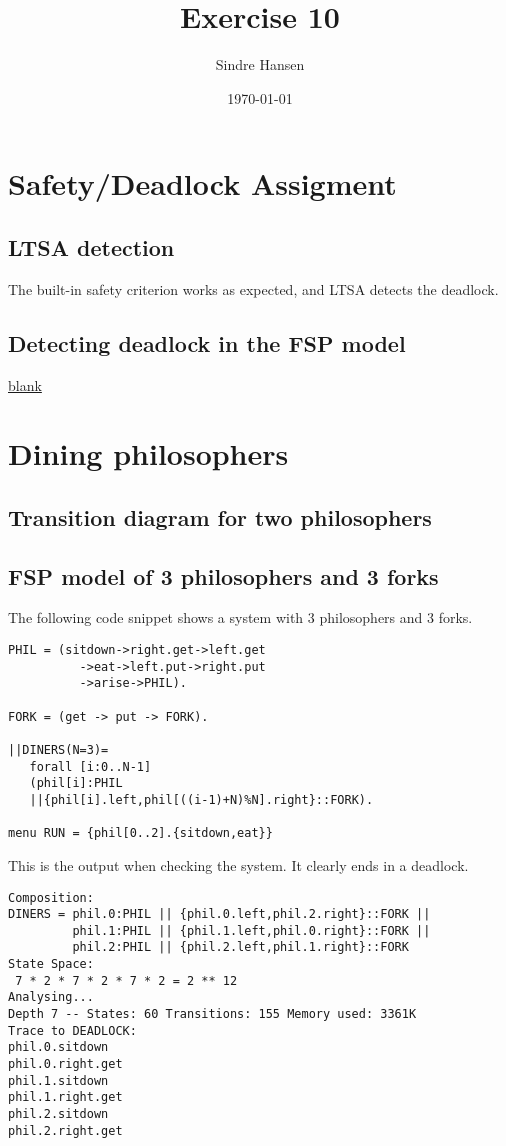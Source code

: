 \documentclass[11pt]{article}
\author{Sindre Hansen}
\date{\today}
\title{Exercise 10}
\begin{document}
\maketitle

\section{Safety/Deadlock Assigment}
\label{sec-1}
\subsection{LTSA detection}
\label{sec-1-1}
The built-in safety criterion works as expected, and LTSA detects the deadlock.
\subsection{Detecting deadlock in the FSP model}
\label{sec-1-2}
\uline{blank}

\section{Dining philosophers}
\label{sec-2}
\subsection{Transition diagram for two philosophers}
\label{sec-2-1}

\subsection{FSP model of 3 philosophers and 3 forks}
\label{sec-2-2}
The following code snippet shows a system with 3 philosophers and 3 forks.

\begin{verbatim}
PHIL = (sitdown->right.get->left.get
          ->eat->left.put->right.put
          ->arise->PHIL).

FORK = (get -> put -> FORK).

||DINERS(N=3)=
   forall [i:0..N-1]
   (phil[i]:PHIL
   ||{phil[i].left,phil[((i-1)+N)%N].right}::FORK).

menu RUN = {phil[0..2].{sitdown,eat}}
\end{verbatim}
This is the output when checking the system. It clearly ends in a deadlock.

\begin{verbatim}
Composition:
DINERS = phil.0:PHIL || {phil.0.left,phil.2.right}::FORK ||
         phil.1:PHIL || {phil.1.left,phil.0.right}::FORK ||
         phil.2:PHIL || {phil.2.left,phil.1.right}::FORK
State Space:
 7 * 2 * 7 * 2 * 7 * 2 = 2 ** 12
Analysing...
Depth 7 -- States: 60 Transitions: 155 Memory used: 3361K
Trace to DEADLOCK:
phil.0.sitdown
phil.0.right.get
phil.1.sitdown
phil.1.right.get
phil.2.sitdown
phil.2.right.get
\end{verbatim}
\end{document}
